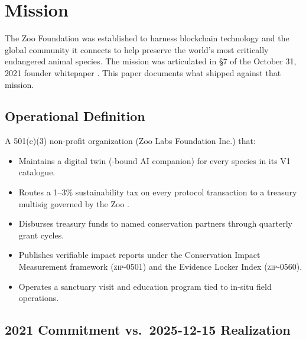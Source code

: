 \section{Mission}
\label{sec:mission}

The Zoo Foundation was established to harness blockchain technology
and the global community it connects to help preserve the world's most
critically endangered animal species. The mission was articulated in
\S7 of the October 31, 2021 founder whitepaper \cite{zoo-2021}. This
paper documents what shipped against that mission.

\subsection{Operational Definition}

A 501(c)(3) non-profit organization (Zoo Labs Foundation Inc.) that:

\begin{itemize}[nosep,leftmargin=1.2em]
\item Maintains a digital twin (\NFT{}-bound AI companion) for every
  species in its V1 catalogue.
\item Routes a 1--3\% sustainability tax on every protocol transaction
  to a treasury multisig governed by the Zoo \DAO{}.
\item Disburses treasury funds to named conservation partners
  through quarterly grant cycles.
\item Publishes verifiable impact reports under the Conservation Impact
  Measurement framework (\textsc{zip-0501}) and the Evidence Locker
  Index (\textsc{zip-0560}).
\item Operates a sanctuary visit and education program tied to in-situ
  field operations.
\end{itemize}

\subsection{2021 Commitment vs.\ 2025-12-15 Realization}

